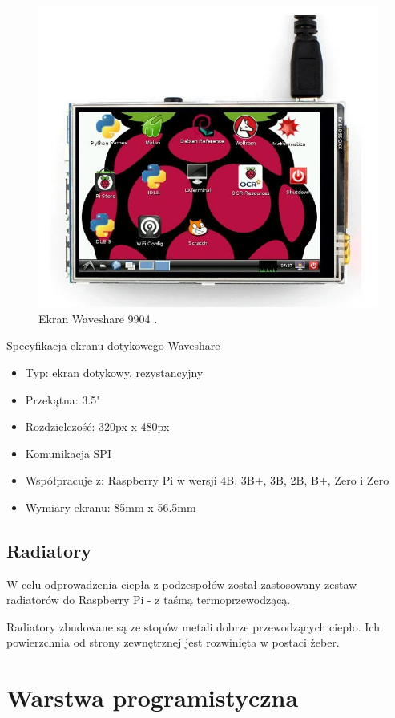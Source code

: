 \documentclass[a4paper,12pt,reqno]{article}
\begin{document}
\begin{figure}[H]%
\centering
\includegraphics[width=0.8\columnwidth]{imgs/ekran.jpg}
\caption{Ekran Waveshare 9904 \cite{img_screen}. \label{ekran}}
\quad
\end{figure}

Specyfikacja ekranu dotykowego Waveshare

\begin{itemize}
	\item Typ: ekran dotykowy, rezystancyjny
	\item Przekątna: 3.5"
	\item Rozdzielczość: 320px x 480px
	\item Komunikacja SPI
	\item Współpracuje z: Raspberry Pi w wersji 4B, 3B+, 3B, 2B, B+, Zero i Zero
	\item Wymiary ekranu: 85mm x 56.5mm
\end{itemize}

\subsection{Radiatory}

W celu odprowadzenia ciepła z podzespołów został zastosowany zestaw radiatorów do Raspberry Pi - z taśmą termoprzewodzącą.

Radiatory zbudowane są ze stopów metali dobrze przewodzących ciepło. Ich powierzchnia od strony zewnętrznej jest rozwinięta w postaci żeber.

\newpage
\section{Warstwa programistyczna} \label{section:warstwa_programistyczna}
\end{document}
